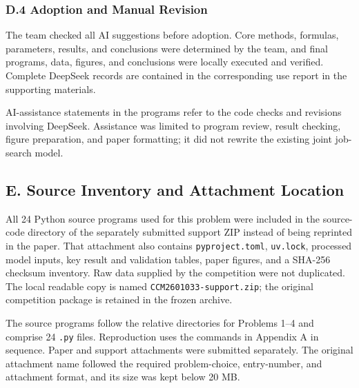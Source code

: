 \subsubsection*{D.4 Adoption and Manual Revision}

The team checked all AI suggestions before adoption. Core methods, formulas, parameters, results, and conclusions were determined by the team, and final programs, data, figures, and conclusions were locally executed and verified. Complete DeepSeek records are contained in the corresponding use report in the supporting materials.

AI-assistance statements in the programs refer to the code checks and revisions involving DeepSeek. Assistance was limited to program review, result checking, figure preparation, and paper formatting; it did not rewrite the existing joint job-search model.

\subsection*{E. Source Inventory and Attachment Location}

All 24 Python source programs used for this problem were included in the source-code directory of the separately submitted support ZIP instead of being reprinted in the paper. That attachment also contains \texttt{pyproject.toml}, \texttt{uv.lock}, processed model inputs, key result and validation tables, paper figures, and a SHA-256 checksum inventory. Raw data supplied by the competition were not duplicated. The local readable copy is named \texttt{CCM2601033-support.zip}; the original competition package is retained in the frozen archive.

The source programs follow the relative directories for Problems 1--4 and comprise 24 \texttt{.py} files. Reproduction uses the commands in Appendix A in sequence. Paper and support attachments were submitted separately. The original attachment name followed the required problem-choice, entry-number, and attachment format, and its size was kept below 20 MB.
